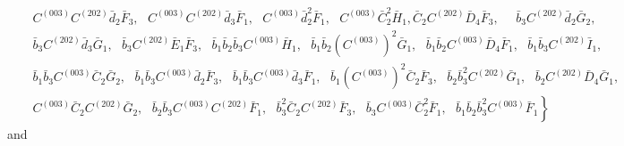 \documentclass[10pt]{amsart}
\theoremstyle{definition}
\theoremstyle{corollary}
\theoremstyle{remark}
\theoremstyle{conclusion}
\begin{document}
\begin{align*}
    &\, \text{ } C^{(003)} C^{(202)} \bar{d}_2 \bar{F}_3, \text{ } C^{(003)} C^{(202)} \bar{d}_3 \bar{F}_1, \text{ } C^{(003)} \bar{d}_2^2 \bar{F}_1, \text{ } C^{(003)} \bar{C}_2^2 \bar{H}_1, \bar{C}_2 C^{(202)} \bar{D}_4 \bar{F}_3, \text{ } \text{ }   \bar{b}_3 C^{(202)} \bar{d}_2 \bar{G}_2,\\ 
    & \,  \text{ } \bar{b}_3 C^{(202)} \bar{d}_3 \bar{G}_1, \text{ } \bar{b}_3 C^{(202)} \bar{E}_1 \bar{F}_3, \text{ }  \bar{b}_1 \bar{b}_2 \bar{b}_3 C^{(003)} \bar{H}_1, \text{ } \bar{b}_1 \bar{b}_2 \left(C^{(003)}\right)^2 \bar{G}_1, \text{ } \bar{b}_1 \bar{b}_2 C^{(003)} \bar{D}_4 \bar{F}_1, \text{ } \bar{b}_1 \bar{b}_3 C^{(202)} \bar{I}_1, \\
    & \, \text{ } \bar{b}_1 \bar{b}_3 C^{(003)} \bar{C}_2 \bar{G}_2, \text{ } \bar{b}_1 \bar{b}_3 C^{(003)} \bar{d}_2 \bar{F}_3, \text{ } \bar{b}_1 \bar{b}_3 C^{(003)} \bar{d}_3 \bar{F}_1, \text{ } \bar{b}_1 \left(C^{(003)}\right)^2 \bar{C}_2 \bar{F}_3, \text{ } \bar{b}_2 \bar{b}_3^2 C^{(202)} \bar{G}_1, \text{ }  \bar{b}_2 C^{(202)} \bar{D}_4 \bar{G}_1,   \\
    & \, \text{ }  \left.  C^{(003)} \bar{C}_2 C^{(202)} \bar{G}_2, \text{ }  \bar{b}_2 \bar{b}_3 C^{(003)} C^{(202)} \bar{F}_1, \text{ } \bar{b}_3^2 \bar{C}_2 C^{(202)} \bar{F}_3, \text{ } \bar{b}_3 C^{(003)} \bar{C}_2^2 \bar{F}_1, \text{ } \bar{b}_1 \bar{b}_2 \bar{b}_3^2 C^{(003)} \bar{F}_1\right\} \nonumber
    \end{align*} and 
\end{document}
